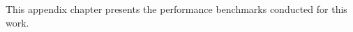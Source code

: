 \label{apx:chap:perf-benchmarks}

This appendix chapter presents the performance benchmarks conducted for this work.
